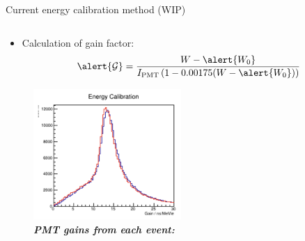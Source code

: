 \documentclass{ikpKoeln}
\begin{document}
\begin{frame}[t]{Current energy calibration method (WIP)}
\begin{columns}[c]
\begin{column}{0.45 \textwidth}
{\begin{itemize}
					      \vspace{-0.5em}
					      $$ \left. \alert{\alpha} = \ln((W_r - W_0) \middle/ (W_l - W_0)) \middle/ (2 \cdot x) \right.$$
					\item \vspace{-1em}Calculation of gain factor:
					      \vspace{-0.5em}
					      $$\alert{\mathcal{G}} = \frac{W - \alert{W_0}}{I_\text{PMT} \left(1 - 0.00175(W - \alert{W_0})\right)}$$
				\end{itemize}
			}
			\begin{figure}
				\captionsetup{singlelinecheck=off}
				\vspace{-2em}
				\caption*{\textit{\textbf{PMT gains from each event:}}}
				\vspace{-1em}
				\includegraphics[width = 0.5\textwidth]{neuland/PMTGains.png}
			\end{figure}
		\end{column}
	\end{columns}
\end{frame}
\end{document}
